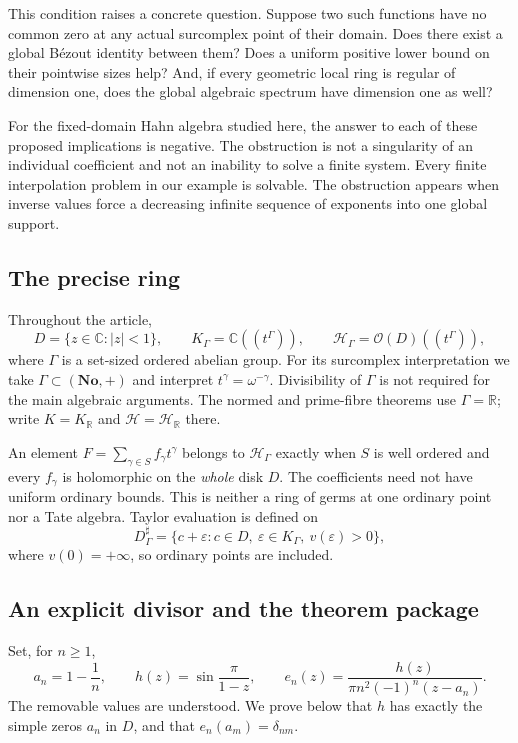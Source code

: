 \documentclass[11pt,letterpaper]{article}
\numberwithin{equation}{section}
\theoremstyle{definition}
\theoremstyle{remark}
\newcommand{\C}{\mathbb C}
\newcommand{\R}{\mathbb R}
\newcommand{\No}{\mathbf{No}}
\newcommand{\OO}{\mathcal O}
\newcommand{\HH}{\mathcal H}
\begin{document}
This condition raises a concrete question. Suppose two such functions
have no common zero at any actual surcomplex point of their domain. Does
there exist a global B\'ezout identity between them? Does a uniform
positive lower bound on their pointwise sizes help? And, if every
geometric local ring is regular of dimension one, does the global
algebraic spectrum have dimension one as well?

For the fixed-domain Hahn algebra studied here, the answer to each of
these proposed implications is negative. The obstruction is not a
singularity of an individual coefficient and not an inability to solve a
finite system. Every finite interpolation problem in our example is
solvable. The obstruction appears when inverse values force a decreasing
infinite sequence of exponents into one global support.

\subsection{The precise ring}
Throughout the article,
\[
 D=\{z\in\C:|z|<1\},\qquad
 K_\Gamma=\C((t^\Gamma)),\qquad
 \HH_\Gamma=\OO(D)((t^\Gamma)),
\]
where $\Gamma$ is a set-sized ordered abelian group. For its surcomplex
interpretation we take $\Gamma\subset(\No,+)$ and interpret
$t^\gamma=\omega^{-\gamma}$. Divisibility of $\Gamma$ is not required for
the main algebraic arguments. The normed and prime-fibre theorems use
$\Gamma=\R$; write $K=K_\R$ and $\HH=\HH_\R$ there.

An element $F=\sum_{\gamma\in S}f_\gamma t^\gamma$ belongs to
$\HH_\Gamma$ exactly when $S$ is well ordered and every $f_\gamma$ is
holomorphic on the \emph{whole} disk $D$. The coefficients need not have
uniform ordinary bounds. This is neither a ring of germs at one ordinary
point nor a Tate algebra. Taylor evaluation is defined on
\[
 D^\sharp_\Gamma=\{c+\varepsilon:c\in D,\ \varepsilon\in K_\Gamma,
                                  \ v(\varepsilon)>0\},
\]
where $v(0)=+\infty$, so ordinary points are included.

\subsection{An explicit divisor and the theorem package}
Set, for $n\ge1$,
\begin{equation}\label{eq:cardinal-data}
 a_n=1-\frac1n,\qquad
 h(z)=\sin\frac{\pi}{1-z},\qquad
 e_n(z)=\frac{h(z)}{\pi n^2(-1)^n(z-a_n)}.
\end{equation}
The removable values are understood. We prove below that $h$ has exactly
the simple zeros $a_n$ in $D$, and that $e_n(a_m)=\delta_{nm}$.
\end{document}
